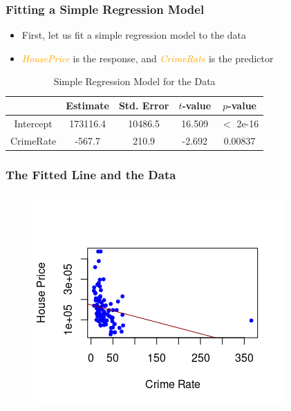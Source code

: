 \documentclass[compress]{beamer}
\begin{document}
\begin{frame}
\frametitle{\sc Fitting a Simple Regression Model}
	\begin{itemize}
		\item First, let us fit a simple regression model to the data
		\item \textcolor{orange}{\textit{HousePrice}} is the response, and \textcolor{orange}{\textit{CrimeRate}} is the predictor
	\end{itemize}
    \begin{table}[hptb]
	\scriptsize
	\caption{\small Simple Regression Model for the Data}
	\begin{center}
		\begin{tabular}{ c c c c c} 
			\toprule
			& Estimate & Std. Error & $t$-value & $p$-value \\
			\midrule
			Intercept & 173116.4 & 10486.5 &  16.509  & $<$ 2e-16 \\
			CrimeRate & -567.7   & 210.9   &  -2.692  & 0.00837 \\ 
			\bottomrule
		\end{tabular}
		\end{center}
\end{table}
\end{frame}

\begin{frame}
\frametitle{\sc The Fitted Line and the Data}
	\begin{figure}[!ht]
		\centering
		\includegraphics[scale=0.9]{figs8/scatter-all-reg.png}
	\end{figure}
\end{frame}
\end{document}
